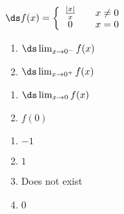 {$\ds f(x) = \left\{\begin{array}{ccc}
	\frac{|x|}{x} & & x\neq 0 \\
	0 & & x=0
	\end{array}
	\right.
$

\noindent\begin{minipage}[t]{.5\linewidth}
\begin{enumerate}
\item		$\ds \lim_{x\to 0^-} f(x)$
\item		$\ds \lim_{x\to 0^+} f(x)$
\end{enumerate}
\end{minipage}
\noindent\begin{minipage}[t]{.5\linewidth}
\begin{enumerate}\addtocounter{enumii}{2}
\item		$\ds \lim_{x\to 0} f(x)$
\item		$f(0)$
\end{enumerate}
\end{minipage}
}
{\begin{enumerate}
\item		$-1$
\item		$1$
\item		Does not exist
\item	  $0$
\end{enumerate}
}


